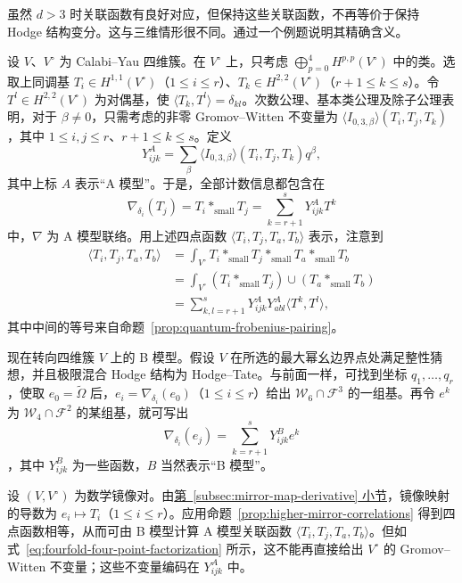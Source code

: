 虽然 $d>3$ 时关联函数有良好对应，但保持这些关联函数，不再等价于保持 Hodge 结构变分。这与三维情形很不同。通过一个例题说明其精确含义。
\begin{example}\label{ex:fourfold-mirror-correlations}
设 $V$、$V^\circ$ 为 Calabi--Yau 四维簇。在 $V^\circ$ 上，只考虑 $\bigoplus_{p=0}^4H^{p,p}(V^\circ)$ 中的类。选取上同调基 $T_i\in H^{1,1}(V^\circ)$（$1\le i\le r$）、$T_k\in H^{2,2}(V^\circ)$（$r+1\le k\le s$）。令 $T^l\in H^{2,2}(V^\circ)$ 为对偶基，使 $\langle T_k,T^l\rangle=\delta_{kl}$。次数公理、基本类公理及除子公理表明，对于 $\beta\ne0$，只需考虑的非零 Gromov--Witten 不变量为 $\langle I_{0,3,\beta}\rangle(T_i,T_j,T_k)$，其中 $1\le i,j\le r$、$r+1\le k\le s$。定义
\[
Y^A_{ijk}=\sum_\beta\langle I_{0,3,\beta}\rangle(T_i,T_j,T_k)q^\beta,
\]
其中上标 $A$ 表示“A 模型”。于是，全部计数信息都包含在
\[
\nabla_{\delta_i}(T_j)=T_i*_{\mathrm{small}}T_j=\sum_{k=r+1}^sY^A_{ijk}T^k
\]
中，$\nabla$ 为 A 模型联络。用上述四点函数 $\langle T_i,T_j,T_a,T_b\rangle$ 表示，注意到
\begin{equation}\label{eq:fourfold-four-point-factorization}
\begin{aligned}
\langle T_i,T_j,T_a,T_b\rangle
&=\int_{V^\circ}T_i*_{\mathrm{small}}T_j*_{\mathrm{small}}T_a*_{\mathrm{small}}T_b\\
&=\int_{V^\circ}(T_i*_{\mathrm{small}}T_j)\cup(T_a*_{\mathrm{small}}T_b)\\
&=\sum_{k,l=r+1}^sY^A_{ijk}Y^A_{abl}\langle T^k,T^l\rangle,
\end{aligned}
\end{equation}
其中中间的等号来自命题~\ref{prop:quantum-frobenius-pairing}。

现在转向四维簇 $V$ 上的 B 模型。假设 $V$ 在所选的最大幂幺边界点处满足整性猜想，并且极限混合 Hodge 结构为 Hodge--Tate。与前面一样，可找到坐标 $q_1,\ldots,q_r$，使取 $e_0=\widetilde\Omega$ 后，$e_i=\nabla_{\delta_i}(e_0)$（$1\le i\le r$）给出 $\mathcal W_6\cap\mathcal F^3$ 的一组基。再令 $e^k$ 为 $\mathcal W_4\cap\mathcal F^2$ 的某组基，就可写出
\[
\nabla_{\delta_i}(e_j)=\sum_{k=r+1}^sY^B_{ijk}e^k
\]
，其中 $Y^B_{ijk}$ 为一些函数，$B$ 当然表示“B 模型”。

设 $(V,V^\circ)$ 为数学镜像对。由\hyperref[subsec:mirror-map-derivative]{第~\ref*{subsec:mirror-map-derivative} 小节}，镜像映射的导数为 $e_i\mapsto T_i$（$1\le i\le r$）。应用命题~\ref{prop:higher-mirror-correlations} 得到四点函数相等，从而可由 B 模型计算 A 模型关联函数 $\langle T_i,T_j,T_a,T_b\rangle$。但如式~\eqref{eq:fourfold-four-point-factorization} 所示，这不能再直接给出 $V^\circ$ 的 Gromov--Witten 不变量；这些不变量编码在 $Y^A_{ijk}$ 中。


\end{example}
